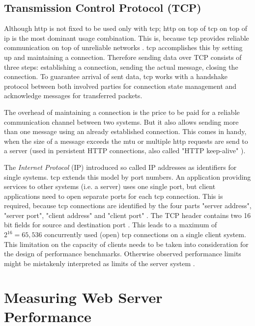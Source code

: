 \subsection{Transmission Control Protocol (TCP)}

Although \gls{http} is not fixed to be used only with \gls{tcp}; \gls{http} on top of \gls{tcp} on top of \gls{ip} is the most dominant usage combination. This is, because \gls{tcp} provides reliable communication on top of unreliable networks \cite{tcp}. \gls{tcp} accomplishes this by setting up and maintaining a connection. Therefore sending data over TCP consists of three steps: establishing a connection, sending the actual message, closing the connection. To guarantee arrival of sent data, \gls{tcp} works with a handshake protocol between both involved parties for connection state management and acknowledge messages for transferred packets. 

The overhead of maintaining a connection is the price to be paid for a reliable communication channel between two systems. But it also allows sending more than one message using an already established connection. This comes in handy, when the size of a message exceeds the \gls{mtu} or multiple \gls{http} requests are send to a server (used in persistent HTTP connections, also called "HTTP keep-alive" \cite{http}).

The \textit{Internet Protocol} (IP) introduced so called IP addresses as identifiers for single systems. \gls{tcp} extends this model by port numbers. An application providing services to other systems (i.e. a server) uses one single port, but client applications need to open separate ports for each \gls{tcp} connection. This is required, because \gls{tcp} connections are identified by the four parts "server address", "server port", "client address" and "client port" \cite{tcp}. The TCP header contains two 16 bit fields for source and destination port \cite{kn1}. This leads to a maximum of $2^{16} = 65,536$ concurrently used (open) \gls{tcp} connections on a single client system. This limitation on the capacity of clients needs to be taken into consideration for the design of performance benchmarks. Otherwise observed performance limits might be mistakenly interpreted as limits of the server system \cite{httperf}.
\\

\clearpage
\section{Measuring Web Server Performance}

